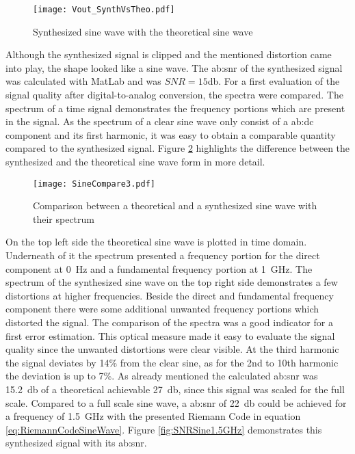 \begin{figure}[htb!]
   \centering
   \texttt{[image: Vout\_SynthVsTheo.pdf]}
   \caption{Synthesized sine wave with the theoretical sine wave}
   \label{fig:SineWaveSynthVsTheoretical}
\end{figure}
Although the synthesized signal is clipped and the mentioned distortion came into play, the shape looked like a sine wave.
The \gls{ab:snr} of the synthesized signal was calculated with MatLab and was $SNR = 15$\si{\decibel}.
For a first evaluation of the signal quality after digital-to-analog conversion, the spectra were compared.
The spectrum of a time signal demonstrates the frequency portions which are present in the signal.
As the spectrum of a clear sine wave only consist of a \gls{ab:dc} component and its first harmonic, it was easy to obtain a comparable quantity compared to the synthesized signal.
Figure \ref{fig:SineCompare} highlights the difference between the synthesized and the theoretical sine wave form in more detail.

\begin{figure}[htb!]
	\centering
  \texttt{[image: SineCompare3.pdf]}
	\caption{Comparison between a theoretical and a synthesized sine wave with their spectrum}
	\label{fig:SineCompare}
\end{figure}

On the top left side the theoretical sine wave is plotted in time domain. 
Underneath of it the spectrum presented a frequency portion for the direct component at \SI{0} {\Hz} and a fundamental frequency portion at \SI{1}{\GHz}. 
The spectrum of the synthesized sine wave on the top right side demonstrates a few distortions at higher frequencies.
Beside the direct and fundamental frequency component there were some additional unwanted frequency portions which distorted the signal.
The comparison of the spectra was a good indicator for a first error estimation.
This optical measure made it easy to evaluate the signal quality since the unwanted distortions were clear visible.
At the third harmonic the signal deviates by 14\% from the clear sine, as for the 2nd to 10th harmonic the deviation is up to 7\%.
As already mentioned the calculated \gls{ab:snr} was \SI{15.2}{\decibel} of a theoretical achievable \SI{27}{\decibel}, since this signal was scaled for the full scale.
Compared to a full scale sine wave, a \gls{ab:snr} of \SI{22}{\decibel} could be achieved for a frequency of \SI{1.5}{\giga \hertz} with the presented Riemann Code in equation \ref{eq:RiemannCodeSineWave}.
Figure \ref{fig:SNRSine1.5GHz} demonstrates this synthesized signal with its \gls{ab:snr}.

